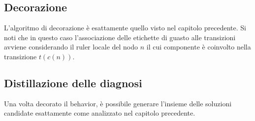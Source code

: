 \subsection{Decorazione}
L'algoritmo di decorazione è esattamente quello visto nel capitolo precedente. Si noti che in questo caso l'associazione delle etichette di guasto alle transizioni avviene considerando il ruler locale del nodo $n$ il cui componente è coinvolto nella transizione $t(c(n))$. 

\subsection{Distillazione delle diagnosi}
Una volta decorato il behavior, è possibile generare l'insieme delle soluzioni candidate esattamente come analizzato nel capitolo precedente.


\newpage
